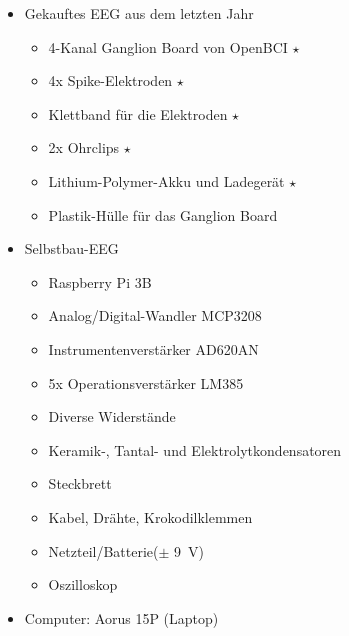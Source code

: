 \documentclass[10pt]{article}
\begin{document}
\begin{itemize}
    \item Gekauftes EEG aus dem letzten Jahr %
        \vspace*{-2ex}
        \begin{multicols}{2} %
        \begin{itemize} %
            \item 4-Kanal Ganglion Board von OpenBCI $\star$
            \item 4x Spike-Elektroden $\star$
            \item Klettband für die Elektroden $\star$
            \item 2x Ohrclips $\star$
            \item Lithium-Polymer-Akku und Ladegerät $\star$
            \item Plastik-Hülle für das Ganglion Board
        \end{itemize}
        \end{multicols}
        \vspace*{-2ex}
    \item Selbstbau-EEG
        \vspace*{-2ex}
        \begin{multicols}{2}
        \begin{itemize}
            \item Raspberry Pi 3B
            \item Analog/Digital-Wandler MCP3208
            \item Instrumentenverstärker AD620AN
            \item 5x Operationsverstärker LM385
            \item Diverse Widerstände
            \item Keramik-, Tantal- und Elektrolytkondensatoren
            \item Steckbrett
            \item Kabel, Drähte, Krokodilklemmen
            \item Netzteil/Batterie($\pm$ \SI{9}{\volt})
            \item Oszilloskop
        \end{itemize}
        \end{multicols}
        \vspace*{-2ex}
    \item Computer: Aorus 15P (Laptop)
    \vspace*{-2ex}
    \begin{multicols}{3}

\end{multicols}
\end{itemize}
\end{document}

